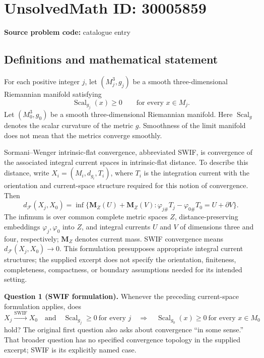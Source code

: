 \documentclass[11pt]{article}
\begin{document}
\section*{UnsolvedMath ID: 30005859}
\textbf{Source problem code:} catalogue entry
\subsection{Definitions and mathematical statement}
For each positive integer \(j\), let \((M_j^3,g_j)\) be a smooth three-dimensional Riemannian manifold satisfying
\[
\operatorname{Scal}_{g_j}(x)\geq 0\qquad\text{for every }x\in M_j.
\]
Let \((M_0^3,g_0)\) be a smooth three-dimensional Riemannian manifold. Here \(\operatorname{Scal}_g\) denotes the scalar curvature of the metric \(g\). Smoothness of the limit manifold does not mean that the metrics converge smoothly.

Sormani--Wenger intrinsic-flat convergence, abbreviated SWIF, is convergence of the associated integral current spaces in intrinsic-flat distance. To describe this distance, write \(X_i=(M_i,d_{g_i},T_i)\), where \(T_i\) is the integration current with the orientation and current-space structure required for this notion of convergence. Then
\[
d_{\mathcal F}(X_j,X_0)
=\inf\bigl\{\mathbf M_Z(U)+\mathbf M_Z(V):
\varphi_{j\#}T_j-\varphi_{0\#}T_0=U+\partial V\bigr\}.
\]
The infimum is over common complete metric spaces \(Z\), distance-preserving embeddings \(\varphi_j,\varphi_0\) into \(Z\), and integral currents \(U\) and \(V\) of dimensions three and four, respectively; \(\mathbf M_Z\) denotes current mass. SWIF convergence means \(d_{\mathcal F}(X_j,X_0)\to0\). This formulation presupposes appropriate integral current structures; the supplied excerpt does not specify the orientation, finiteness, completeness, compactness, or boundary assumptions needed for its intended setting.

\textbf{Question 1 (SWIF formulation).} Whenever the preceding current-space formulation applies, does
\[
X_j\xrightarrow{\mathrm{SWIF}}X_0
\quad\text{and}\quad
\operatorname{Scal}_{g_j}\geq0\ \text{for every }j
\quad\Longrightarrow\quad
\operatorname{Scal}_{g_0}(x)\geq0\ \text{for every }x\in M_0
\]
hold? The original first question also asks about convergence ``in some sense.'' That broader question has no specified convergence topology in the supplied excerpt; SWIF is its explicitly named case.
\end{document}
